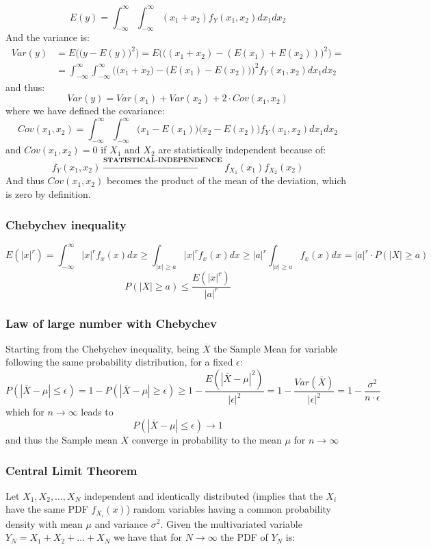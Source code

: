 \[E(y)=\int_{-\infty}^{\infty}\int_{-\infty}^{\infty}(x_{1}+x_{2})f_{Y}(x_{1},x_{2})dx_{1}dx_{2}\]
And the variance is:
\begin{equation}
\begin{split}
    Var(y)&=E\Big(\big(y-E(y)\big)^2\Big)=
E\Big(\big((x_{1}+x_{2})-(E(x_{1})+E(x_{2}))\big)^2\Big)=\\
&=\int_{-\infty}^{\infty}\int_{-\infty}^{\infty}\Big(\big(x_{1}+x_{2}\big)-\big(E(x_{1})-E(x_{2})\big)\Big)^2f_{Y}(x_{1},x_{2})dx_{1}dx_{2}
\end{split}
\end{equation}
and thus:
\[Var(y)=Var(x_{1})+Var(x_{2})+2\cdot Cov(x_{1},x_{2})\]
where we have defined the covariance:
\[Cov(x_{1},x_{2})=\int_{-\infty}^{\infty}\int_{-\infty}^{\infty}\big(x_{1}-E(x_{1})\big)\big(x_{2}-E(x_{2})\big)f_{Y}(x_{1},x_{2})dx_{1}dx_{2}\]
and $Cov(x_{1},x_{2})=0$ if $X_{1}$ and $X_{2}$ are statistically independent because of:
\[f_{Y}(x_{1},x_{2})\overset{\textbf{STATISTICAL-INDEPENDENCE}}{\rightarrow}f_{X_{1}}(x_{1})f_{X_{2}}(x_{2})\]
And thus $Cov(x_{1},x_{2})$ becomes the product of the mean of the deviation, which is zero by definition.

\subsubsection{Chebychev inequality}
\[E(|x|^r)=\int_{-\infty}^{\infty}|x|^r f_{x}(x) dx\geq \int_{|x|\geq a}|x|^r f_{x}(x) dx \geq |a|^r \int_{|x|\geq a} f_{x}(x) dx=|a|^r\cdot P(|X| \geq a)\]
\[  P(|X| \geq a) \leq \frac{E(|x|^r)}{|a|^r}  \]




\subsubsection{Law of large number with Chebychev}
Starting from the Chebychev inequality, being $\overline{X}$ the Sample Mean for variable following the same probability distribution, for a fixed $\epsilon$:
\[P(|\overline{X}-\mu| \leq \epsilon) =1 - P(|\overline{X}-\mu| \geq \epsilon) \geq 1-\frac{E(|\overline{X}-\mu|^2)}{|\epsilon|^2}= 1-\frac{Var(\overline{X})}{|\epsilon|^2}=1-\frac{\sigma^2}{n\cdot \epsilon}\]
which for $n \to \infty$ leads to
\[P(|\overline{X}-\mu| \leq \epsilon) \to 1\]
and thus the Sample mean $\overline{X}$ converge in probability to the mean $\mu$ for $n \to \infty$

\subsubsection{Central Limit Theorem} 
Let $X_{1},X_{2},\dots ,X_{N}$ independent and identically distributed (implies that the $X_{i}$ have the same PDF $f_{X_{i}}(x)$) random variables having a common probability density with mean $\mu$ and variance $\sigma^{2}$.
Given the multivariated variable $Y_{N}=X_{1}+X_{2}+\dots+X_{N}$ we have that for $N\rightarrow \infty$ the PDF of $Y_{N}$ is:

